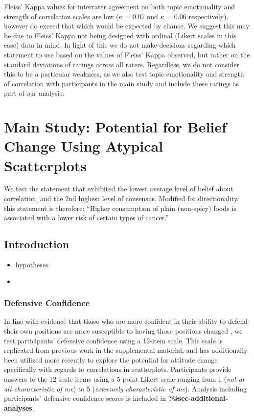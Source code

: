 \documentclass[manuscript,screen,review]{acmart}
\providecommand{\tightlist}{%
  \setlength{\itemsep}{0pt}\setlength{\parskip}{0pt}}\usepackage{longtable,booktabs,array}
\begin{document}
Fleiss' Kappa values for interrater agreement on both topic emotionality
and strength of correlation scales are low (\(\kappa\) = 0.07 and
\(\kappa\) = 0.06 respectively), however do exceed that which would be
expected by chance. We suggest this may be due to Fleiss' Kappa not
being designed with ordinal (Likert scales in this case) data in mind.
In light of this we do not make decisions regarding which statement to
use based on the values of Fleiss' Kappa observed, but rather on the
standard deviations of ratings across all raters. Regardless, we do not
consider this to be a particular weakness, as we also test topic
emotionality and strength of correlation with participants in the main
study and include these ratings as part of our analysis.

\section{Main Study: Potential for Belief Change Using Atypical
Scatterplots}\label{sec-main-study}

We test the statement that exhibited the lowest average level of belief
about correlation, and the 2nd highest level of consensus. Modified for
directionality, this statement is therefore: ``Higher consumption of
plain (non-spicy) foods is associated with a lower risk of certain types
of cancer.''

\subsection{Introduction}\label{introduction}

\begin{itemize}
\tightlist
\item
  hypotheses
\item
\end{itemize}

\subsubsection{Defensive Confidence}\label{defensive-confidence}

In line with evidence that those who are more confident in their ability
to defend their own positions are more susceptible to having those
positions changed \citep{albarracin_2004}, we test participants'
defensive confidence using a 12-item scale. This scale is replicated
from previous work in the supplemental material, and has additionally
been utilized more recently \citep{markant_2023} to explore the
potential for attitude change specifically with regards to correlations
in scatterplots. Participants provide answers to the 12 scale items
using a 5 point Likert scale ranging from 1 (\emph{not at all
characteristic of me}) to 5 (\emph{extremely characteristic of me}).
Analysis including participants' defensive confidence scores is included
in \textbf{?@sec-additional-analyses}.
\end{document}
